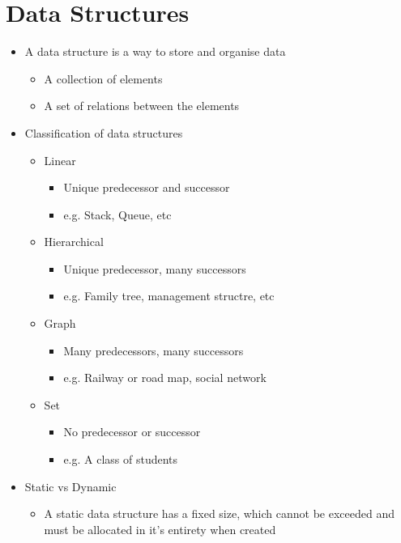 
\section*{Data Structures}

\begin{itemize}
  \item A data structure is a way to store and organise data
  \begin{itemize}
    \item A collection of elements
    \item A set of relations between the elements
  \end{itemize}
  \item Classification of data structures
  \begin{itemize}
    \item Linear
    \begin{itemize}
      \item Unique predecessor and successor
      \item e.g. Stack, Queue, etc
    \end{itemize}
    \item Hierarchical
    \begin{itemize}
      \item Unique predecessor, many successors
      \item e.g. Family tree, management structre, etc
    \end{itemize}
    \item Graph
    \begin{itemize}
      \item Many predecessors, many successors
      \item e.g. Railway or road map, social network
    \end{itemize}
    \item Set
    \begin{itemize}
      \item No predecessor or successor
      \item e.g. A class of students
    \end{itemize}
  \end{itemize}
  \item Static vs Dynamic
  \begin{itemize}
    \item A static data structure has a fixed size, which cannot be exceeded and must be allocated in it's entirety when created

\end{itemize}
\end{itemize}
